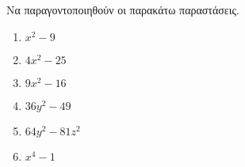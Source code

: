 Να παραγοντοποιηθούν οι παρακάτω παραστάσεις.
\begin{multicols}{3}
\begin{enumerate}[label=\roman*.]
\item $ x^2-9 $
\item $ 4x^2-25 $
\item $ 9x^2-16 $
\item $ 36y^2-49 $
\item $ 64y^2-81z^2 $
\item $ x^4-1 $
\end{enumerate}
\end{multicols}
